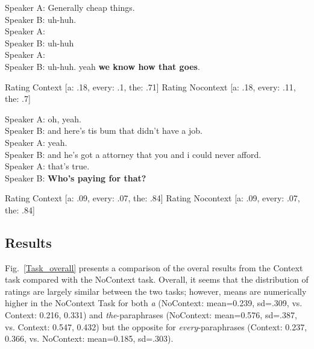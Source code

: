 \documentclass[12pt,letterpaper,table,svgnames,dvipsnames]{article}
\newcommand{\figref}[1]{Fig.~\ref{#1}}
\begin{document}

\begin{exe}
    \ex {}
    Speaker A: Generally cheap things.\\
    Speaker B: uh-huh.\\
    Speaker A: \\
    Speaker B: uh-huh\\
    Speaker A: \\
    Speaker B: uh-huh. yeah \textbf{we know how that goes}.\\
\end{exe}
Rating Context [a: .18, every: .1, the: .71]
Rating Nocontext [a: .18, every: .11, the: .7]


\begin{exe}
    \ex {}
    Speaker A: oh, yeah.\\
    Speaker B: and here's tis bum that didn't have a job.\\
    Speaker A: yeah.\\
    Speaker B: and he's got a attorney that you and i could never afford.\\
    Speaker A: that's true.\\
    Speaker B: \textbf{Who's paying for that?}\\
\end{exe}
Rating Context [a: .09, every: .07, the: .84]
Rating Nocontext [a: .09, every: .07, the: .84]





\subsection{Results}

\figref{Task_overall} presents a comparison of the overal results from the Context task compared with the NoContext task. Overall, it seems that the distribution of ratings are largely similar between the two tasks; however, means are numerically higher in the NoContext Task for both \emph{a} (NoContext: mean=0.239, sd=.309, vs. Context: 0.216, 0.331) and \emph{the}-paraphrases (NoContext: mean=0.576, sd=.387, vs. Context: 0.547, 0.432) but the opposite for \emph{every}-paraphrases (Context: 0.237, 0.366, vs. NoContext: mean=0.185, sd=.303). 
\end{document}
